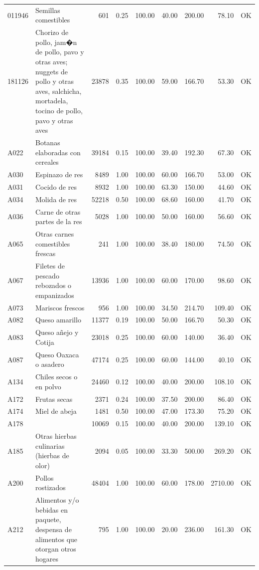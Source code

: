 \begin{table}[ht]
\begin{tabular}{llrrrrrrl}
  011946 & Semillas comestibles & 601 & 0.25 & 100.00 & 40.00 & 200.00 & 78.10 & OK \\ 
  181126 & Chorizo de pollo, jam�n de pollo, pavo y otras aves; nuggets de pollo y otras aves, salchicha, mortadela, tocino de pollo, pavo y otras aves & 23878 & 0.35 & 100.00 & 59.00 & 166.70 & 53.30 & OK \\ 
  A022 & Botanas elaboradas con cereales & 39184 & 0.15 & 100.00 & 39.40 & 192.30 & 67.30 & OK \\ 
  A030 & Espinazo de res & 8489 & 1.00 & 100.00 & 60.00 & 166.70 & 53.00 & OK \\ 
  A031 & Cocido de res & 8932 & 1.00 & 100.00 & 63.30 & 150.00 & 44.60 & OK \\ 
  A034 & Molida de res & 52218 & 0.50 & 100.00 & 68.60 & 160.00 & 41.70 & OK \\ 
  A036 & Carne de otras partes de la res & 5028 & 1.00 & 100.00 & 50.00 & 160.00 & 56.60 & OK \\ 
  A065 & Otras carnes comestibles frescas & 241 & 1.00 & 100.00 & 38.40 & 180.00 & 74.50 & OK \\ 
  A067 & Filetes de pescado rebozados o empanizados & 13936 & 1.00 & 100.00 & 60.00 & 170.00 & 98.60 & OK \\ 
  A073 & Mariscos frescos & 956 & 1.00 & 100.00 & 34.50 & 214.70 & 109.40 & OK \\ 
  A082 & Queso amarillo & 11377 & 0.19 & 100.00 & 50.00 & 166.70 & 50.30 & OK \\ 
  A083 & Queso añejo y Cotija & 23018 & 0.25 & 100.00 & 60.00 & 140.00 & 36.40 & OK \\ 
  A087 & Queso Oaxaca o asadero & 47174 & 0.25 & 100.00 & 60.00 & 144.00 & 40.10 & OK \\ 
  A134 & Chiles secos o en polvo & 24460 & 0.12 & 100.00 & 40.00 & 200.00 & 108.10 & OK \\ 
  A172 & Frutas secas & 2371 & 0.24 & 100.00 & 37.50 & 200.00 & 86.40 & OK \\ 
  A174 & Miel de abeja & 1481 & 0.50 & 100.00 & 47.00 & 173.30 & 75.20 & OK \\ 
  A178 &  & 10069 & 0.15 & 100.00 & 40.00 & 200.00 & 139.10 & OK \\ 
  A185 & Otras hierbas culinarias (hierbas de olor) & 2094 & 0.05 & 100.00 & 33.30 & 500.00 & 269.20 & OK \\ 
  A200 & Pollos rostizados & 48404 & 1.00 & 100.00 & 60.00 & 178.00 & 2710.00 & OK \\ 
  A212 & Alimentos y/o bebidas en paquete, despensa de alimentos que otorgan otros hogares & 795 & 1.00 & 100.00 & 20.00 & 236.00 & 161.30 & OK \\ 

\end{tabular}
\end{table}
